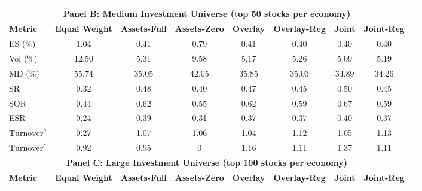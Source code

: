 \begin{table}[htbp]
{\begin{tabular}{lcccccccc}
    \midrule
    \multicolumn{8}{c}{\textbf{Panel B: Medium Investment Universe (top 50 stocks per economy)}} \\
    \midrule
    \textbf{Metric} & \textbf{Equal Weight} & \textbf{Assets-Full} & \textbf{Assets-Zero} & \textbf{Overlay} & \textbf{Overlay-Reg} & \textbf{Joint} & \textbf{Joint-Reg}\\
    \midrule
    ES (\%)                 & 1.04                        & 0.41                 & 0.79                & 0.41                & 0.40             & 0.40             & 0.40                \\
    Vol (\%)                & 12.50                       & 5.31                 & 9.58                & 5.17                & 5.26             & 5.09             & 5.19               \\
    MD (\%)                 & 55.74                       & 35.05                & 42.05               & 35.85               & 35.03            & 34.89            & 34.26               \\
    SR                      & 0.32                        & 0.48                 & 0.40                & 0.47                & 0.45             & 0.50             & 0.45               \\
    SOR                     & 0.44                        & 0.62                 & 0.55                & 0.62                & 0.59             & 0.67             & 0.59               \\
    ESR                     & 0.24                        & 0.39                 & 0.31                & 0.37                & 0.37             & 0.40             & 0.37               \\
    $\text{Turnover}^a$     & 0.27                        & 1.07                 & 1.06                & 1.04                & 1.12             & 1.05             & 1.13               \\
    $\text{Turnover}^c$     & 0.92                        & 0.95                 & 0                   & 1.16                & 1.11             & 1.37             & 1.11               \\
    \midrule
    \multicolumn{8}{c}{\textbf{Panel C: Large Investment Universe (top 100 stocks per economy)}} \\
    \midrule
    \textbf{Metric} & \textbf{Equal Weight} & \textbf{Assets-Full} & \textbf{Assets-Zero} & \textbf{Overlay} & \textbf{Overlay-Reg} & \textbf{Joint} & \textbf{Joint-Reg}\\
    \midrule

\end{tabular}}
\end{table}
